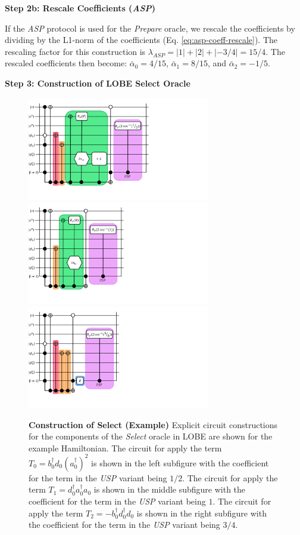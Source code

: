 \textbf{Step 2b: Rescale Coefficients (\textit{ASP})}

If the \textit{ASP} protocol is used for the \textit{Prepare} oracle, we rescale the coefficients by dividing by the L1-norm of the coefficients (Eq. \ref{eq:asp-coeff-rescale}).
The rescaling factor for this construction is $\lambda_{ASP} = |1| + |2| + |-3/4| = 15/4$.
The rescaled coefficients then become: $\bar{\alpha}_0 = 4/15$, $\bar{\alpha}_1 = 8/15$, and $\bar{\alpha}_2 = -1/5$.

\textbf{Step 3: Construction of LOBE Select Oracle}

\begin{figure}[h]
    \label{fig:example-select}
    \includegraphics[height=4.5cm]{figures/T0.pdf}
    \includegraphics[height=4.5cm]{figures/T1.pdf}
    \includegraphics[height=4.5cm]{figures/T2.pdf}
    \caption{
        \textbf{Construction of Select (Example)}
        Explicit circuit constructions for the components of the \textit{Select} oracle in LOBE are shown for the example Hamiltonian.
        The circuit for apply the term $T_0 = b_0^\dagger d_0(a_0^\dagger)^2$ is shown in the left subfigure with the coefficient for the term in the \textit{USP} variant being $1/2$.
        The circuit for apply the term $T_1 = d_0^\dagger a_0^\dagger a_0$ is shown in the middle subfigure with the coefficient for the term in the \textit{USP} variant being $1$.
        The circuit for apply the term $T_2 = - b_0^\dagger d_0^\dagger d_0$ is shown in the right subfigure with the coefficient for the term in the \textit{USP} variant being $3/4$.
    }
\end{figure}

